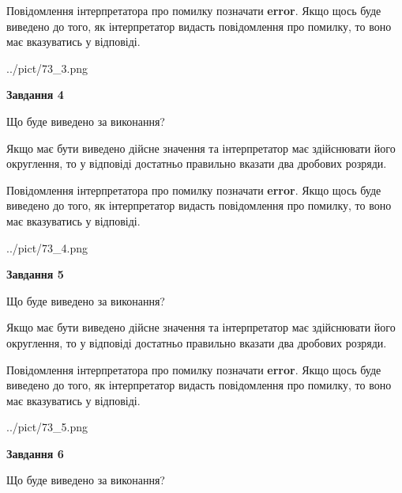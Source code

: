 \documentclass[12pt, ukrainian]{article}
\begin{document}
{\begin {Large}
Повідомлення інтерпретатора про помилку позначати \textbf{error}.
Якщо щось буде виведено до того, як інтерпретатор видасть повідомлення про помилку, 
то воно має вказуватись у відповіді. \par

\begin{center}
	{../pict/73_3.png}
\end{center}
\newpage

{\begin {center}\textbf{Завдання 4}\end {center}}\par
Що буде виведено за виконання? \par

Якщо має бути виведено дійсне значення та інтерпретатор має здійснювати його округлення, 
то у відповіді достатньо правильно вказати два дробових розряди.

Повідомлення інтерпретатора про помилку позначати \textbf{error}.
Якщо щось буде виведено до того, як інтерпретатор видасть повідомлення про помилку, 
то воно має вказуватись у відповіді. \par

\begin{center}
	{../pict/73_4.png}
\end{center}
\newpage

{\begin {center}\textbf{Завдання 5}\end {center}}\par
Що буде виведено за виконання? \par

Якщо має бути виведено дійсне значення та інтерпретатор має здійснювати його округлення, 
то у відповіді достатньо правильно вказати два дробових розряди.

Повідомлення інтерпретатора про помилку позначати \textbf{error}.
Якщо щось буде виведено до того, як інтерпретатор видасть повідомлення про помилку, 
то воно має вказуватись у відповіді. \par

\begin{center}
	{../pict/73_5.png}
\end{center}
\newpage

{\begin {center}\textbf{Завдання 6}\end {center}}\par
Що буде виведено за виконання? \par


\end{Large}}
\end{document}
